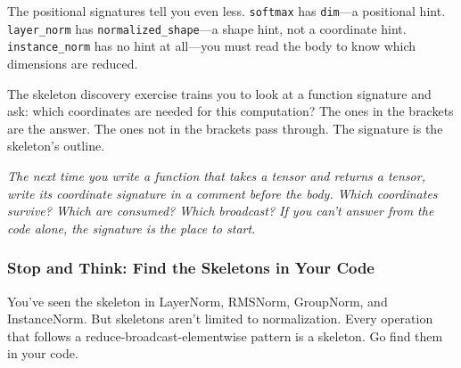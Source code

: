\documentclass[11pt,titlepage]{article}
\begin{document}
The positional signatures tell you even less. \texttt{softmax} has
\texttt{dim}---a positional hint. \texttt{layer\_norm} has
\texttt{normalized\_shape}---a shape hint, not a coordinate hint.
\texttt{instance\_norm} has no hint at all---you must read the body to
know which dimensions are reduced.

The skeleton discovery exercise trains you to look at a function
signature and ask: which coordinates are needed for this computation?
The ones in the brackets are the answer. The ones not in the brackets
pass through. The signature is the skeleton's outline.

\vspace{2em}

\emph{The next time you write a function that takes a tensor and returns
a tensor, write its coordinate signature in a comment before the body.
Which coordinates survive? Which are consumed? Which broadcast? If you
can't answer from the code alone, the signature is the place to start.}

\vspace{2em}

\hypertarget{stop-and-think-find-the-skeletons-in-your-code}{%
\subsubsection{Stop and Think: Find the Skeletons in Your
Code}\label{stop-and-think-find-the-skeletons-in-your-code}}

You've seen the skeleton in LayerNorm, RMSNorm, GroupNorm, and
InstanceNorm. But skeletons aren't limited to normalization. Every
operation that follows a reduce-broadcast-elementwise pattern is a
skeleton. Go find them in your code.
\end{document}
